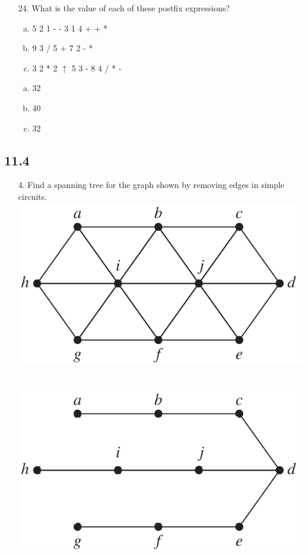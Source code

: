 \begin{itemize}
\item[24.]  What is the value of each of these postfix expressions?
\begin{enumerate}[a.]
\item 5 2 1 - - 3 1 4 + + *
\item 9 3 / 5 + 7 2 - *
\item 3 2 * 2 $\uparrow$ 5 3 - 8 4 / * -
\end{enumerate}
\answer
\begin{enumerate}[a.]
    \item 32
    \item 40
    \item 32
\end{enumerate}
\end{itemize}

\subsection{11.4}
\begin{itemize}
    \item[4.] Find a spanning tree for the graph shown by 
    removing edges in simple circuits. \\
    \includegraphics[scale=0.7]{img/11_4_4_graph.png} \\
    \answer \\
    \text{} \\
    \includegraphics[scale=0.7]{img/11_4_4_tree.png}
\end{itemize}

